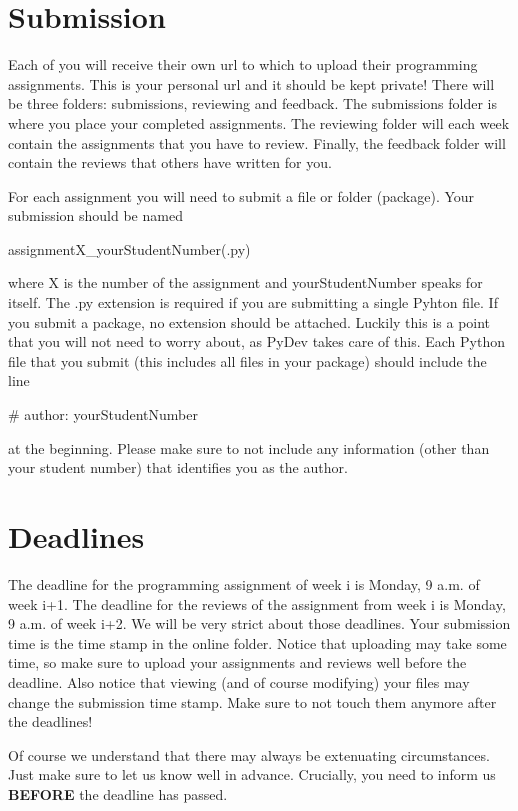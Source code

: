 \documentclass[a4paper, leqno, 11pt]{article}
\begin{document}
\section{Submission} \label{submission}
Each of you will receive their own url to which to upload their programming assignments. This is your personal url and it should
be kept private! There will be three folders: submissions, reviewing and feedback. The submissions folder is where you place your
completed assignments. The reviewing folder will each week contain the assignments that you have to review. Finally, the feedback
folder will contain the reviews that others have written for you.

For each assignment you will need to submit a file or folder (package). Your submission should be named
\begin{center}
assignmentX\_yourStudentNumber(.py)
\end{center}
where X is the number of the assignment and yourStudentNumber speaks for itself. The .py extension is required if you are submitting a
single Pyhton file. If you submit a package, no extension should be attached. Luckily this is a point that you will not need 
to worry about, as PyDev takes care of this. Each Python file that you submit (this includes all files in your package) should
include the line
\begin{center}
\# author: yourStudentNumber
\end{center}
at the beginning. Please make sure to not include any information (other than your student number) that identifies you as the author.

\section{Deadlines}
The deadline for the programming assignment of week i is Monday, 9 a.m. of week i+1. The deadline for the reviews of the assignment
from week i is Monday, 9 a.m. of week i+2. We will be very strict about those deadlines. Your submission time is the time stamp in
the online folder. Notice that uploading may take some time, so make sure to upload your assignments and reviews well before the deadline.
Also notice that viewing (and of course modifying) your files may change the submission time stamp. Make sure to not touch them anymore
after the deadlines!

Of course we understand that there may always be extenuating circumstances. Just make sure to let us know well in advance. Crucially,
you need to inform us \textbf{BEFORE} the deadline has passed.
\end{document}
